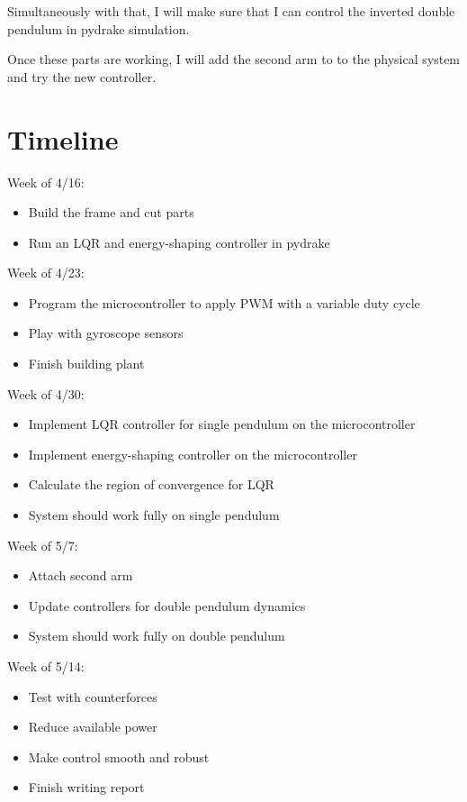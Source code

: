 \documentclass{article}
\begin{document}
Simultaneously with that, I will make sure that I can control the inverted double pendulum in pydrake simulation.

Once these parts are working, I will add the second arm to to the physical system and try the new controller.

\section{Timeline}
Week of 4/16:
\begin{itemize}
	\item Build the frame and cut parts
	\item Run an LQR and energy-shaping controller in pydrake
\end{itemize}
Week of 4/23:
\begin{itemize}
	\item Program the microcontroller to apply PWM with a variable duty cycle
	\item Play with gyroscope sensors
	\item Finish building plant
\end{itemize}
Week of 4/30:
\begin{itemize}
	\item Implement LQR controller for single pendulum on the microcontroller
	\item Implement energy-shaping controller on the microcontroller
	\item Calculate the region of convergence for LQR
	\item System should work fully on single pendulum
\end{itemize}
Week of 5/7:
\begin{itemize}
	\item Attach second arm
	\item Update controllers for double pendulum dynamics
	\item System should work fully on double pendulum
\end{itemize}
Week of 5/14:
\begin{itemize}
	\item Test with counterforces
	\item Reduce available power
	\item Make control smooth and robust
	\item Finish writing report
\end{itemize}
\end{document}
